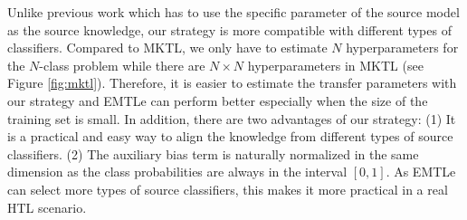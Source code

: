 Unlike previous work\cite{aytar2011tabula,tommasi2014learning,yang2007adapting} which has to use the specific parameter of the source model as the source knowledge, our strategy is more compatible with different types of classifiers. Compared to MKTL\cite{jie2011multiclass}, we only have to estimate $N$ hyperparameters for the $N$-class problem while there are \mbox{$N\times N$} hyperparameters in MKTL (see Figure \ref{fig:mktl}). Therefore, it is easier to estimate the transfer parameters with our strategy and EMTLe can perform better especially when the size of the training set is small.
In addition, there are two advantages of our strategy: (1) It is a practical and easy way to align the knowledge from different types of source classifiers.
(2) The auxiliary bias term is naturally normalized in the same dimension as the class probabilities are always in the interval $[0,1]$.  As EMTLe can select more types of source classifiers, this makes it more practical in a real HTL scenario.











